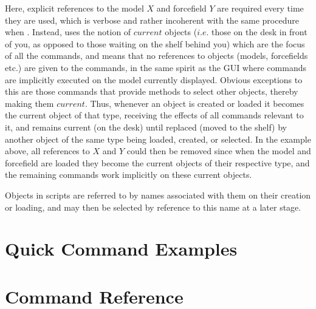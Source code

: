 Here, explicit references to the model $X$ and forcefield $Y$ are required every time they are used, which is verbose and rather incoherent with the same procedure when . Instead, \progname{} uses the notion of $current$ objects ($i.e.$ those on the desk in front of you, as opposed to those waiting on the shelf behind you) which are the focus of all the commands, and means that no references to objects (models, forcefields etc.) are given to the commands, in the same spirit as the GUI where commands are implicitly executed on the model currently displayed. Obvious exceptions to this are those commands that provide methods to select other objects, thereby making them $current$.
Thus, whenever an object is created or loaded it becomes the current object of that type, receiving the effects of all commands relevant to it, and remains current (on the desk) until replaced (moved to the shelf) by another object of the same type being loaded, created, or selected. In the example above, all references to $X$ and $Y$ could then be removed since when the model and forcefield are loaded they become the current objects of their respective type, and the remaining commands work implicitly on these current objects.

Objects in scripts are referred to by names associated with them on their creation or loading, and may then be selected by reference to this name at a later stage.


\section{Quick Command Examples}

\section{Command Reference}

